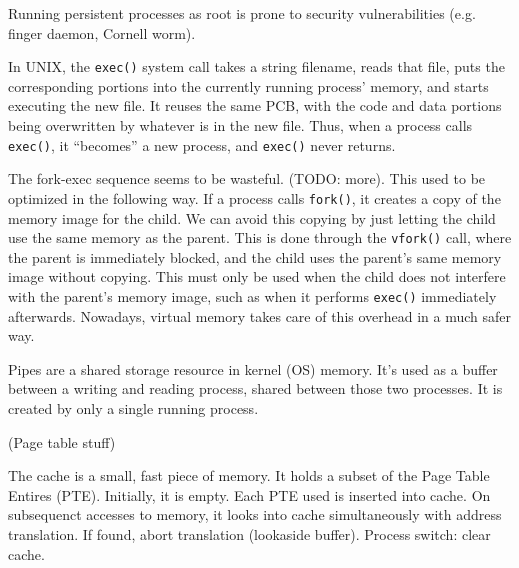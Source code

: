 \documentclass[code]{amznotes}
\begin{document}
\begin{notebox}
    Running persistent processes as root is prone to security vulnerabilities (e.g. finger daemon, Cornell worm).
\end{notebox}

In UNIX, the \texttt{exec()} system call takes a string filename, reads that file, puts the corresponding portions into the currently running process' memory, and starts executing the new file. It reuses the same PCB, with the code and data portions being overwritten by whatever is in the new file. Thus, when a process calls \texttt{exec()}, it ``becomes'' a new process, and \texttt{exec()} never returns.

The fork-exec sequence seems to be wasteful. (TODO: more). This used to be optimized in the following way. If a process calls \texttt{fork()}, it creates a copy of the memory image for the child. We can avoid this copying by just letting the child use the same memory as the parent. This is done through the \texttt{vfork()} call, where the parent is immediately blocked, and the child uses the parent's same memory image without copying. This must only be used when the child does not interfere with the parent's memory image, such as when it performs \texttt{exec()} immediately afterwards. Nowadays, virtual memory takes care of this overhead in a much safer way.

Pipes are a shared storage resource in kernel (OS) memory. It's used as a buffer between a writing and reading process, shared between those two processes. It is created by only a single running process.


(Page table stuff)

The cache is a small, fast piece of memory. It holds a subset of the Page Table Entires (PTE). Initially, it is empty. Each PTE used is inserted into cache. On subsequenct accesses to memory, it looks into cache simultaneously with address translation. If found, abort translation (lookaside buffer). Process switch: clear cache.
\end{document}

